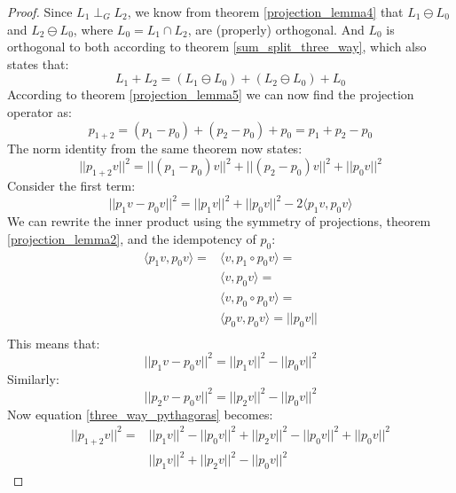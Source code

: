 \documentclass[12pt, a4paper]{article}
\numberwithin{equation}{section}
\begin{document}
\begin{proof}
Since $L_1\perp_G L_2$, we know from theorem \ref{projection_lemma4} that $L_1\ominus L_0$ and $L_2\ominus L_0$, where $L_0=L_1\cap L_2$, are (properly) orthogonal. And $L_0$ is orthogonal to both according to theorem \ref{sum_split_three_way}, which also states that:
\begin{equation}
L_1+L_2=(L_1\ominus L_0)+(L_2\ominus L_0)+L_0
\end{equation}
According to theorem \ref{projection_lemma5} we can now find the projection operator as:
\begin{equation}
p_{1+2}=(p_1-p_0)+(p_2-p_0)+p_0=p_1+p_2-p_0
\end{equation}
The norm identity from the same theorem now states:
\begin{equation}
\label{three_way_pythagoras}
||p_{1+2}v||^2=||(p_1-p_0)v||^2+||(p_2-p_0)v||^2+||p_0 v||^2
\end{equation}
Consider the first term:
\begin{equation}
||p_1 v-p_0 v||^2=||p_1 v||^2+||p_0 v||^2-2\langle p_1 v, p_0 v\rangle
\end{equation}
We can rewrite the inner product using the symmetry of projections, theorem \ref{projection_lemma2}, and the idempotency of $p_0$:
\begin{align}
\langle p_1 v, p_0 v\rangle=&\langle v, p_1\circ p_0 v\rangle=\\
&\langle v, p_0 v\rangle=\\
&\langle v, p_0\circ p_0 v\rangle=\\
&\langle p_0 v, p_0 v\rangle=||p_0 v||\\
\end{align}
This means that:
\begin{equation}
||p_1 v-p_0 v||^2=||p_1 v||^2-||p_0 v||^2
\end{equation}
Similarly:
\begin{equation}
||p_2 v-p_0 v||^2=||p_2 v||^2-||p_0 v||^2
\end{equation}
Now equation \ref{three_way_pythagoras} becomes:
\begin{align}
||p_{1+2}v||^2=&||p_1 v||^2-||p_0 v||^2+||p_2 v||^2-||p_0 v||^2+||p_0 v||^2\\
&||p_1 v||^2+||p_2 v||^2-||p_0 v||^2
\end{align}
\end{proof}
\end{document}
